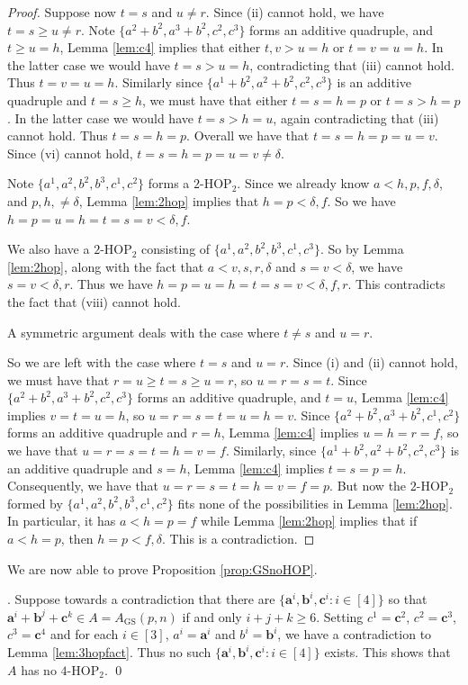 \documentclass[12pt,oneside,british,a4wide]{amsart}
\numberwithin{equation}{section}
\theoremstyle{definition}
\def\HOP{\mathrm{HOP}}
\def\GS{\mathrm{GS}}
\newenvironment{proofof}[1]{\indent{\itshape Proof of #1}.\;}{\qed}
\begin{document}
\begin{proof}
Suppose now $t=s$ and $u\neq r$.  Since (ii) cannot hold, we have $t=s\geq u\neq r$. Note $\{a^2+b^2,a^3+b^2,c^2,c^3\}$ forms an additive quadruple, and  $t\geq u=h$, Lemma \ref{lem:c4} implies that either $t,v>u=h$ or $t=v=u=h$.  In the latter case we would have $t=s>u=h$, contradicting that (iii) cannot hold.  Thus $t=v=u=h$. Similarly since $\{a^1+b^2,a^2+b^2,c^2,c^3\}$ is an additive quadruple and $t=s\geq h$, we must have that either $t=s=h=p$ or $t=s>h=p$. In the latter case we would have $t=s>h=u$, again contradicting that (iii) cannot hold.  Thus $t=s=h=p$.  Overall we have that $t=s=h=p=u=v$.  Since (vi) cannot hold, $t=s=h=p=u=v\neq \delta$.

Note $\{a^1,a^2,b^2,b^3,c^1,c^2 \}$ forms a $2$-$\HOP_2$.  Since we already know $a<h,p,f,\delta$, and $p,h,\neq \delta$, Lemma \ref{lem:2hop} implies that $h=p<\delta,f$.  So we have $h=p=u=h=t=s=v<\delta,f$.


We also have a $2$-$\HOP_2$ consisting of $\{a^1,a^2,b^2,b^3,c^1,c^3\}$. So by Lemma \ref{lem:2hop}, along with the fact that $a<v,s,r,\delta$ and $s=v<\delta$, we have $s=v<\delta,r$.  Thus we have $h=p=u=h=t=s=v<\delta,f,r$.  This contradicts the fact that (viii) cannot hold.



A symmetric argument deals with the case where $t\neq s$ and $u=r$.

So we are left with the case where $t=s$ and $u=r$.  Since (i) and (ii) cannot hold, we must have that $r=u\geq t=s\geq u=r$, so $u=r=s=t$.  Since $\{a^2+b^2,a^3+b^2,c^2,c^3\}$ forms an additive quadruple, and $t=u$, Lemma \ref{lem:c4} implies $v=t=u=h$, so $u=r=s=t=u=h=v$.  Since $\{a^2+b^2,a^3+b^2,c^1,c^2\}$ forms an additive quadruple and $r=h$, Lemma \ref{lem:c4} implies $u=h=r=f$, so we have that $u=r=s=t=h=v=f$.  Similarly, since $\{a^1+b^2,a^2+b^2,c^2,c^3\}$ is an additive quadruple and $s=h$, Lemma \ref{lem:c4} implies $t=s=p=h$.  Consequently, we have that $u=r=s=t=h=v=f=p$.  But now the $2$-$\HOP_2$ formed by $\{a^1,a^2,b^2,b^3,c^1,c^2\}$ fits none of the possibilities in Lemma \ref{lem:2hop}.  In particular, it has $a<h=p=f$ while Lemma \ref{lem:2hop} implies that if $a<h=p$, then $h=p<f,\delta$.  This is a contradiction. 
\end{proof}



We are now able to prove Proposition \ref{prop:GSnoHOP}.

\vspace{2mm}

\begin{proofof}{Proposition \ref{prop:GSnoHOP}}
Suppose towards a contradiction that there are $\{\mathbf{a}^i, \mathbf{b}^i, \mathbf{c}^i: i\in [4]\}$ so that $\mathbf{a}^i+\mathbf{b}^j+\mathbf{c}^k\in A=A_{\GS}(p,n)$ if and only $i+j+k\geq 6$.  Setting $c^1=\mathbf{c}^2$, $c^2=\mathbf{c}^3$, $c^3=\mathbf{c}^4$ and for each $i\in [3]$, $a^i=\mathbf{a}^i$ and $b^i=\mathbf{b}^i$, we have a contradiction to Lemma \ref{lem:3hopfact}.  Thus no such $\{\mathbf{a}^i, \mathbf{b}^i, \mathbf{c}^i: i\in [4]\}$ exists. This shows that $A$ has no $4$-$\HOP_2$.
\end{proofof}
\end{document}
